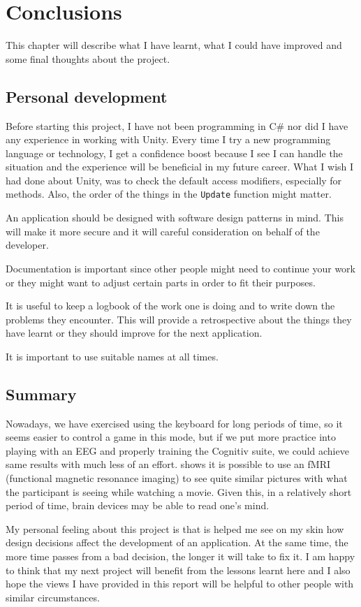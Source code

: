 \chapter{Conclusions}
\label{cha:conclusions}
This chapter will describe what I have learnt, what I could have improved and some final thoughts about the project.

\section{Personal development}
Before starting this project, I have not been programming in C\# nor did I have any experience in working with Unity. Every time I try a new programming language or technology, I get a confidence boost because I see I can handle the situation and the experience will be beneficial in my future career. What I wish I had done about Unity, was to check the default access modifiers, especially for methods. Also, the order of the things in the \texttt{Update} function might matter. 

An application should be designed with software design patterns in mind. This will make it more secure and it will careful consideration on behalf of the developer. 

Documentation is important since other people might need to continue your work or they might want to adjust certain parts in order to fit their purposes.

It is useful to keep a logbook of the work one is doing and to write down the problems they encounter. This will provide a retrospective about the things they have learnt or they should improve for the next application.

It is important to use suitable names at all times.

\section{Summary}

Nowadays, we have exercised using the keyboard for long periods of time, so it seems easier to control a game in this mode, but if we put more practice into playing with an EEG and properly training the Cognitiv suite, we could achieve same results with much less of an effort. \cite{moviebrain} shows it is possible to use an fMRI (functional magnetic resonance imaging) to see quite similar pictures with what the participant is seeing while watching a movie. Given this, in a relatively short period of time, brain devices may be able to read one's mind.

My personal feeling about this project is that is helped me see on my skin how design decisions affect the development of an application. At the same time, the more time passes from a bad decision, the longer it will take to fix it. I am happy to think that my next project will benefit from the lessons learnt here and I also hope the views I have provided in this report will be helpful to other people with similar circumstances.
